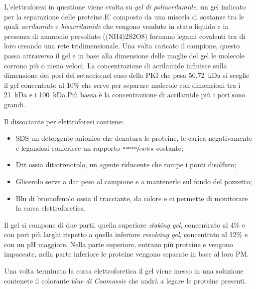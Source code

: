 \documentclass[twocolumn,a4paper,10pt]{my_report}
\begin{document}
{L'elettroforesi in questione viene svolta su \emph{gel di poliacrilamide}, un gel indicato per la separazione delle proteine.E' composto da una miscela di sostanze tra le quali \emph{acrilamide} e \emph{bisacrilamide} che vengono vendute in stato liquido e in presenza di ammonio persolfato (\ch(NH4)2S2O8) formano legami covalenti tra di loro creando una rete tridimensionale.
Una volta caricato il campione, questo passa attraverso il gel e in base alla dimensione delle maglie del gel le molecole corrono più o meno veloci.
La concentrazione di acrilamide influisce sulla dimensione dei pori del setaccio;nel caso della PKI che pesa \SI{50,72}{\kilo\dalton} si sceglie il gel concentrato al 10\% che serve per separare molecole con dimensioni tra i \SI{21}{\kilo\dalton} e i \SI{100}{\kilo\dalton}.Più bassa è la concentrazione di acrilamide più i pori sono grandi.

Il dissociante per elettroforesi contiene:
\begin{itemize}
 \item SDS \textrightarrow un detergente anionico che denatura le proteine, le carica negativamente e legandosi conferisce un rapporto $\sfrac{\text{massa}}{\text{carica}}$ costante;
 \item Dtt \textrightarrow ossia ditiotreiotolo, un agente riducente che rompe i ponti disolfuro;
 \item Glicerolo \textrightarrow serve a dar peso al campione e a mantenerlo sul fondo del pozzetto;
 \item Blu di bromofenolo \textrightarrow ossia il tracciante, da colore e ci permette di monitorare la corsa elettroforetica.
 \end{itemize}

Il gel si compone di due parti, quella superiore \emph{staking gel}, concentrato al 4\% e con pori più larghi rispetto a quella inferiore \emph{resolving gel}, concentrato al 12\% e con un pH maggiore.
Nella parte superiore, entrano più proteine e vengono impaccate, nella parte inferiore le proteine vengono separate in base al loro PM.

Una volta terminata la corsa elettroforetica il gel viene messo in una soluzione contenete il colorante \emph{blue di Coomassie} che andrà a legare le proteine presenti.

}
\end{document}
